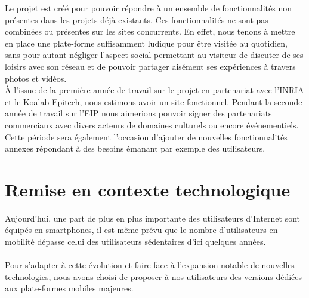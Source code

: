 \documentclass{life-fr}
\begin{document}
Le projet est créé pour pouvoir répondre à un ensemble de fonctionnalités non présentes dans les projets déjà existants. Ces fonctionnalités ne sont pas combinées ou présentes sur les sites concurrents. En effet, nous tenons à mettre en place une plate-forme suffisamment ludique pour être visitée au quotidien, sans pour autant négliger l’aspect social permettant au visiteur de discuter de ses loisirs avec son réseau et de pouvoir partager aisément ses expériences à travers photos et vidéos.\\

À l'issue de la première année de travail sur le projet en partenariat avec l'INRIA et le Koalab Epitech, nous estimons avoir un site fonctionnel. Pendant la seconde année de travail sur l'EIP nous aimerions pouvoir signer des partenariats commerciaux avec divers acteurs de domaines culturels ou encore événementiels. Cette période sera également l'occasion d'ajouter de nouvelles fonctionnalités annexes répondant à des besoins émanant par exemple des utilisateurs.

\section{Remise en contexte technologique}

Aujourd'hui, une part de plus en plus importante des utilisateurs d'Internet sont équipés en smartphones, il est même prévu que le nombre d'utilisateurs en mobilité dépasse celui des utilisateurs sédentaires d'ici quelques années.\\
\\
Pour s’adapter à cette évolution et faire face à l’expansion notable de nouvelles technologies, nous avons choisi de proposer à nos utilisateurs des versions dédiées aux plate-formes mobiles majeures.\\
\\
\end{document}
